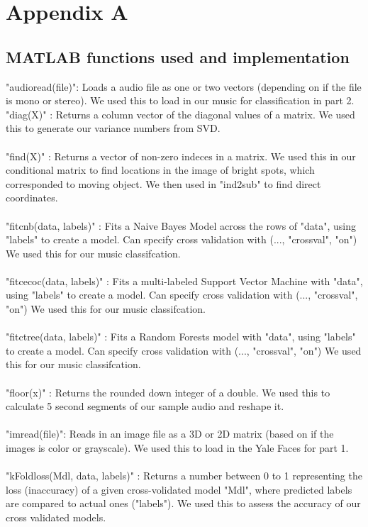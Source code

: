 \documentclass{article}
\begin{document}
\section*{\fontsize{19}{15}\selectfont Appendix A}
\subsection*{MATLAB functions used and implementation}
"audioread(file)": Loads a audio file as one or two vectors (depending on if the file is mono or stereo). We used this to load in our music for classification in part 2. \\
"diag(X)" : Returns a column vector of the diagonal values of a matrix. We used this to generate our variance numbers from SVD. \\ \\
"find(X)" : Returns a vector of non-zero indeces in a matrix. We used this in our conditional matrix to find locations in the image of bright spots, which corresponded to moving object. We then used in "ind2sub" to find direct coordinates.  \\ \\
"fitcnb(data, labels)" : Fits a Naive Bayes Model across the rows of "data", using "labels" to create a model. Can specify cross validation with (..., "crossval", "on") We used this for our music classifcation. \\ \\
"fitcecoc(data, labels)" : Fits a multi-labeled Support Vector Machine with "data", using "labels" to create a model. Can specify cross validation with (..., "crossval", "on") We used this for our music classifcation. \\ \\
"fitctree(data, labels)" : Fits a Random Forests model with "data", using "labels" to create a model. Can specify cross validation with (..., "crossval", "on") We used this for our music classifcation. \\ \\
"floor(x)" : Returns the rounded down integer of a double. We used this to calculate 5 second segments of our sample audio and reshape it. \\ \\
"imread(file)": Reads in an image file as a 3D or 2D matrix (based on if the images is color or grayscale). We used this to load in the Yale Faces for part 1. \\ \\
"kFoldloss(Mdl, data, labels)" : Returns a number between 0 to 1 representing the loss (inaccuracy) of a given cross-volidated model "Mdl", where predicted labels are compared to actual ones ("labels"). We used this to assess the accuracy of our cross validated models. \\ \\
\end{document}
